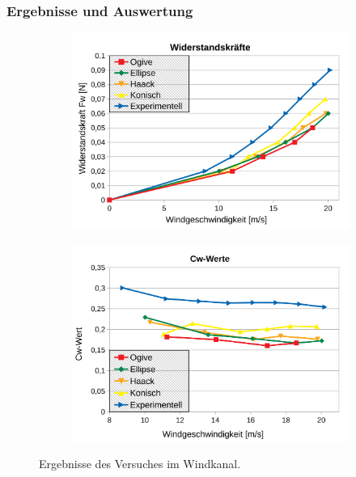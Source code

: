 \documentclass[10pt,a4paper]{article}
\begin{document}
\subsubsection{Ergebnisse und Auswertung}

\begin{figure}[H]
\begin{subfigure}[l]{0.49\textwidth}
	\centering
	\includegraphics[width=\textwidth]{Bilder/Messwerte-Fw.png}
	\label{sfig-Messwerte-Fw}
\end{subfigure}
\begin{subfigure}[r]{0.49\textwidth}
	\centering
	\includegraphics[width=\textwidth]{Bilder/Messwerte-Cw.png}
	\label{sfig-Messwerte-Cw}
\end{subfigure}
\caption{Ergebnisse des Versuches im Windkanal.}
\end{figure}
\end{document}
